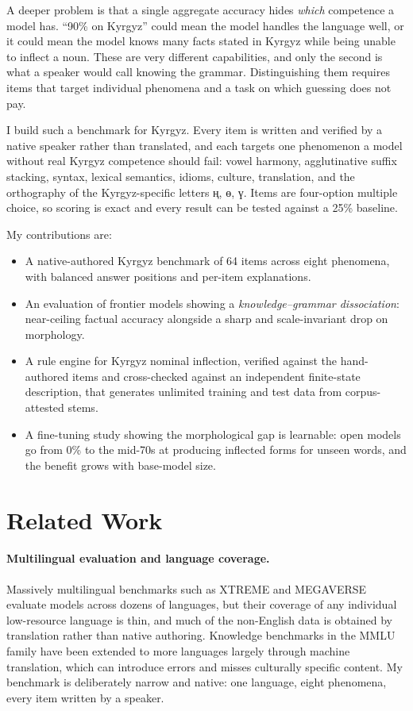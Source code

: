 \documentclass[11pt]{article}
\newcommand{\ky}[1]{\foreignlanguage{russian}{#1}}
\begin{document}
A deeper problem is that a single aggregate accuracy hides \emph{which} competence a
model has. ``90\% on Kyrgyz'' could mean the model handles the language well, or it
could mean the model knows many facts stated in Kyrgyz while being unable to inflect a
noun. These are very different capabilities, and only the second is what a speaker
would call knowing the grammar. Distinguishing them requires items that target
individual phenomena and a task on which guessing does not pay.

I build such a benchmark for Kyrgyz. Every item is written and verified by a native
speaker rather than translated, and each targets one phenomenon a model without real
Kyrgyz competence should fail: vowel harmony, agglutinative suffix stacking, syntax,
lexical semantics, idioms, culture, translation, and the orthography of the
Kyrgyz-specific letters \ky{ң}, \ky{ө}, \ky{ү}. Items are four-option multiple choice,
so scoring is exact and every result can be tested against a 25\% baseline.

My contributions are:
\begin{itemize}
  \item A native-authored Kyrgyz benchmark of 64 items across eight phenomena, with
        balanced answer positions and per-item explanations.
  \item An evaluation of frontier models showing a \emph{knowledge--grammar
        dissociation}: near-ceiling factual accuracy alongside a sharp and
        scale-invariant drop on morphology.
  \item A rule engine for Kyrgyz nominal inflection, verified against the
        hand-authored items and cross-checked against an independent finite-state
        description, that generates unlimited training and test data from
        corpus-attested stems.
  \item A fine-tuning study showing the morphological gap is learnable: open models
        go from 0\% to the mid-70s at producing inflected forms for unseen words, and
        the benefit grows with base-model size.
\end{itemize}

\section{Related Work}
\label{sec:related}

\paragraph{Multilingual evaluation and language coverage.}
Massively multilingual benchmarks such as XTREME \cite{hu2020xtreme} and
MEGAVERSE \cite{ahuja2024megaverse} evaluate models across dozens of languages, but
their coverage of any individual low-resource language is thin, and much of the
non-English data is obtained by translation rather than native authoring. Knowledge
benchmarks in the MMLU family \cite{hendrycks2021mmlu} have been extended to more
languages largely through machine translation, which can introduce errors and misses
culturally specific content. My benchmark is deliberately narrow and native: one
language, eight phenomena, every item written by a speaker.
\end{document}

